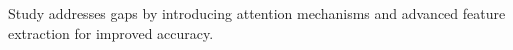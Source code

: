 Study addresses gaps by introducing attention mechanisms and advanced feature extraction for improved accuracy.